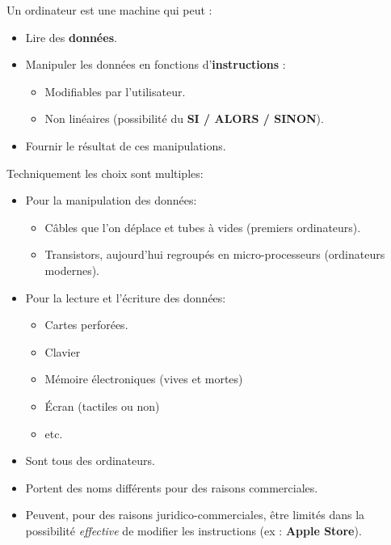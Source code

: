 \begin{slide}
  Un ordinateur est une machine qui peut :
  \begin{itemize}
    \item Lire des \textbf{données}. 
    \item Manipuler les données en fonctions d'\textbf{instructions} :
      \begin{itemize}
	\item Modifiables par l'utilisateur.
	\item Non linéaires (possibilité du \textbf{SI / ALORS / SINON}). %
      \end{itemize}
    \item Fournir le résultat de ces manipulations. 
  \end{itemize}
\end{slide}
\begin{slide}
  Techniquement les choix sont multiples:
  \begin{itemize}
    \item Pour la manipulation des données:
      \begin{itemize}
	\item Câbles que l'on déplace et tubes à vides (premiers ordinateurs).
	\item Transistors, aujourd'hui regroupés en micro-processeurs (ordinateurs modernes).
      \end{itemize}
    \item Pour la lecture et l'écriture des données:
      \begin{itemize}
	\item Cartes perforées.
	\item Clavier
	\item Mémoire électroniques (vives et mortes)
	\item Écran (tactiles ou non)
	\item etc.
      \end{itemize}
  \end{itemize}
  
\end{slide}
\begin{slide}
			\begin{itemize}
				\item Sont tous des ordinateurs.
				\item Portent des noms différents pour des raisons commerciales.
				\item Peuvent, pour des raisons juridico-commerciales, être limités dans la possibilité \emph{effective} de modifier les instructions (ex : \textbf{Apple Store}).
			\end{itemize}
\end{slide}
